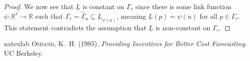 \documentclass[11pt]{article}
\newcommand{\Comments}{1}
\newcommand{\mynote}[2]{\ifnum\Comments=1\textcolor{#1}{#2}\fi}
\newcommand{\raf}[1]{\mynote{darkgreen}{[RF: #1]}}
\newcommand{\interior}{\mathrm{int}\,}
\newcommand{\E}{\mathbb{E}}
\renewcommand{\P}{\mathcal{P}}
\newcommand{\Y}{\mathcal{Y}}
\newcommand{\defeq}{\doteq}
\def\reals{\mathbb{R}}
\newcommand{\lbar}{\underline{L}}
\renewcommand{\Comments}{1}
\begin{document}
\begin{proof}
  We now see that $\lbar$ is constant on $\Gamma_r$ since there is some link function $\psi:\reals^\ell\to\reals$ such that $\Gamma_r = \hat\Gamma_u \subseteq \lbar_{\psi(u)}$, meaning $\lbar(p) = \psi(u)$ for all $p\in\Gamma_r$.
  This statement contradicts the assumption that $\lbar$ is non-constant on $\Gamma_r$.
\end{proof}




\begin{thebibliography}{1}
\expandafter\ifx\csname natexlab\endcsname\relax\def\natexlab#1{#1}\fi
{}
\textsc{Osband, K.~H.} (1985).
\newblock \textit{Providing {Incentives} for {Better} {Cost} {Forecasting}}.
\newblock UC Berkeley.
\end{thebibliography}
\end{document}
